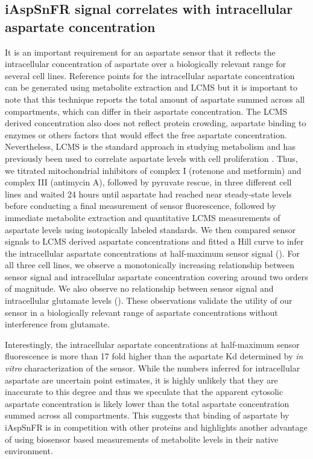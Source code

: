 \documentclass[9pt,lineno]{elife}
\begin{document}
\subsection{iAspSnFR signal correlates with intracellular aspartate concentration}
It is an important requirement for an aspartate sensor that it reflects the intracellular concentration of aspartate over a biologically relevant range for several cell lines.
Reference points for the intracellular aspartate concentration can be generated using metabolite extraction and LCMS but it is important to note that this technique reports the total amount of aspartate summed across all compartments, which can differ in their aspartate concentration.
The LCMS derived concentration also does not reflect protein crowding, aspartate binding to enzymes or others factors that would effect the free aspartate concentration.
Nevertheless, LCMS is the standard approach in studying metabolism and has previously been used to correlate aspartate levels with cell proliferation \citep{Gui2016-ca}.
Thus, we titrated mitochondrial inhibitors of complex I (rotenone and metformin) and complex III (antimycin A), followed by pyruvate rescue, in three different cell lines and waited 24 hours until aspartate had reached near steady-state levels before conducting a final measurement of sensor fluorescence, followed by immediate metabolite extraction and quantitative LCMS measurements of aspartate levels using isotopically labeled standards.
We then compared sensor signals to LCMS derived aspartate concentrations and fitted a Hill curve to infer the intracellular aspartate concentrations at half-maximum sensor signal ().
For all three cell lines, we observe a monotonically increasing relationship between sensor signal and intracellular aspartate concentration covering around two orders of magnitude.
We also observe no relationship between sensor signal and intracellular glutamate levels ().
These observations validate the utility of our sensor in a biologically relevant range of aspartate concentrations without interference from glutamate.

Interestingly, the intracellular aspartate concentrations at half-maximum sensor fluorescence is more than 17 fold higher than the aspartate Kd determined by \textit{in vitro} characterization of the sensor.
While the numbers inferred for intracellular aspartate are uncertain point estimates, it is highly unlikely that they are inaccurate to this degree and thus we speculate that the apparent cytosolic aspartate concentration is likely lower than the total aspartate concentration summed across all compartments.
This suggests that binding of aspartate by iAspSnFR is in competition with other proteins and highlights another advantage of using biosensor based measurements of metabolite levels in their native environment.
\end{document}
